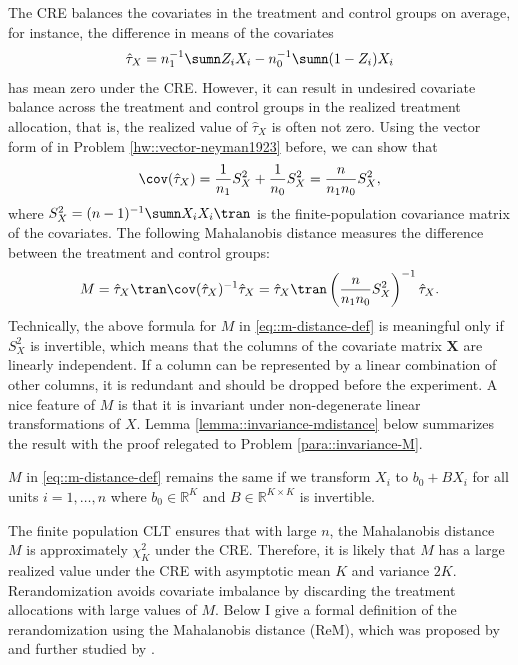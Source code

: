 The CRE balances the covariates in the treatment and control groups on average, for instance, the difference in means of the covariates
$$
\hat{\tau}_X  = n_1^{-1} \sumn Z_i X_i - n_0^{-1} \sumn (1-Z_i) X_i
$$
has mean zero under the CRE. However, it can result in undesired covariate balance across the treatment and control groups in the realized treatment allocation, that is, the realized value of $\hat{\tau}_X  $ is often not zero. Using the vector form of \citet{Neyman:1923} in Problem \ref{hw::vector-neyman1923} before, we can show that
$$
\cov(\hat{\tau}_X  ) 
= \frac{1}{n_1}  S_X^2  + \frac{1}{n_0}  S_X^2   
=  \frac{n}{n_1 n_0} S_X^2   ,
$$
where $ S_X^2   = (n-1)^{-1} \sumn  X_i X_i\tran $ is the finite-population covariance matrix of the covariates. The following Mahalanobis distance measures the difference between the treatment and control groups:
\begin{equation}
\label{eq::m-distance-def}
M = \hat{\tau}_X \tran \cov(\hat{\tau}_X  )^{-1} \hat{\tau}_X  = \hat{\tau}_X \tran  \left(  \frac{n}{n_1 n_0} S_X^2   \right)^{-1} \hat{\tau}_X  . 
\end{equation}
Technically, the above formula for $M$ in \eqref{eq::m-distance-def} is meaningful only if $S_X^2 $ is invertible, which means that the columns of the covariate matrix $\bm{X}$ are linearly independent. If a column can be represented by a linear combination of other columns, it is redundant and should be dropped before the experiment. 
A nice feature of $M$ is that it is invariant under non-degenerate linear transformations of $X$. Lemma \ref{lemma::invariance-mdistance} below summarizes the result with the proof relegated to Problem \ref{para::invariance-M}. 

\begin{lemma}\label{lemma::invariance-mdistance}
$M$ in \eqref{eq::m-distance-def} remains the same if we transform $X_i$ to $b_0  + BX_i$ for all units $i=1,\ldots, n$ where $b_0  \in \mathbb{R}^K$ and $B \in \mathbb{R}^{K\times K}$ is invertible. 
\end{lemma}




The finite population CLT \citep{li2017general} ensures that with large $n$, the Mahalanobis distance $M $ is approximately $ \chi^2_K$ under the CRE. Therefore, it is likely that $M$ has a large realized value under the CRE with asymptotic mean $K$ and variance $2K$. Rerandomization avoids covariate imbalance by discarding the treatment allocations with large values of $M$. Below I give a formal definition of the rerandomization using the Mahalanobis distance (ReM), which was proposed by \citet{cox:1982} and further studied by \citet{morgan2012rerandomization}. 



